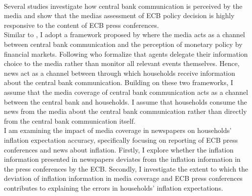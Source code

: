 \documentclass[review]{elsarticle}
\begin{document}
%
%
\\
Several studies investigate how central bank communication is perceived by the media \cite{Berger2011} and \cite{Picaultetal2022} show that the medias assessment of ECB policy decision is highly responsive to the content of ECB press conferences. %
%
%
\\
Similar to \cite{Picaultetal2022}, I adopt a framework proposed by \cite{HayoNeuenkirch2015} where the media acts as a channel between central bank communication and the perception of monetary policy by financial markets. Following \cite{Nimark2019} who formalize that agents delegate their information choice to the media rather than monitor all relevant events themselves. Hence, news act as a channel between through which households receive information about the central bank communication. Building on these two frameworks, I assume that the media coverage of central bank communication acts as a channel between the central bank and households. I assume that households consume the news from the media about the central bank communication rather than directly from the central bank communication itself. 
%
%
%
\\
I am examining the impact of media coverage in newspapers on households' inflation expectation accuracy, specifically focusing on reporting of ECB press conferences and news about inflation. Firstly, I explore whether the inflation information presented in newspapers deviates from the inflation information in the press conferences by the ECB. Secondly, I investigate the extent to which the deviation of inflation information in media coverage and ECB press conferences contributes to explaining the errors in households' inflation expectations.
\end{document}
